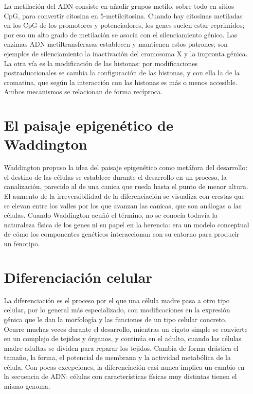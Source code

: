 \documentclass{book}
\begin{document}
La metilación del ADN consiste en añadir grupos metilo, sobre todo en sitios CpG, para convertir citosina en 5-metilcitosina. Cuando hay citosinas metiladas en los CpG de los promotores y potenciadores, los genes suelen estar reprimidos; por eso un alto grado de metilación se asocia con el silenciamiento génico. Las enzimas ADN metiltransferasas establecen y mantienen estos patrones; son ejemplos de silenciamiento la inactivación del cromosoma X y la impronta génica. La otra vía es la modificación de las histonas: por modificaciones postraduccionales se cambia la configuración de las histonas, y con ella la de la cromatina, que según la interacción con las histonas es más o menos accesible. Ambos mecanismos se relacionan de forma recíproca.


\section{El paisaje epigenético de Waddington}

Waddington propuso la idea del paisaje epigenético como metáfora del desarrollo: el destino de las células se establece durante el desarrollo en un proceso, la canalización, parecido al de una canica que rueda hasta el punto de menor altura. El aumento de la irreversibilidad de la diferenciación se visualiza con crestas que se elevan entre los valles por los que avanzan las canicas, que son análogas a las células. Cuando Waddington acuñó el término, no se conocía todavía la naturaleza física de los genes ni su papel en la herencia: era un modelo conceptual de cómo los componentes genéticos interaccionan con su entorno para producir un fenotipo.


\section{Diferenciación celular}

La diferenciación es el proceso por el que una célula madre pasa a otro tipo celular, por lo general más especializado, con modificaciones en la expresión génica que le dan la morfología y las funciones de un tipo celular concreto. Ocurre muchas veces durante el desarrollo, mientras un cigoto simple se convierte en un complejo de tejidos y órganos, y continúa en el adulto, cuando las células madre adultas se dividen para reparar los tejidos. Cambia de forma drástica el tamaño, la forma, el potencial de membrana y la actividad metabólica de la célula. Con pocas excepciones, la diferenciación casi nunca implica un cambio en la secuencia de ADN: células con características físicas muy distintas tienen el mismo genoma.
\end{document}
